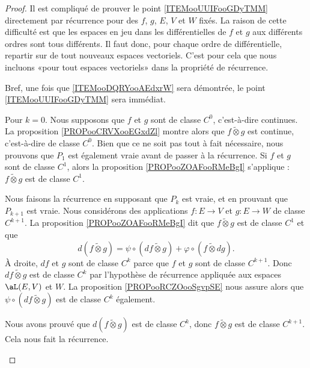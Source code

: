 \begin{proof}
	Il est compliqué de prouver le point \ref{ITEMooUUIFooGDyTMM} directement par récurrence pour des \( f\), \( g\), \( E\), \( V\) et \( W\) fixés. La raison de cette difficulté est que les espaces en jeu dans les différentielles de \( f\) et \( g\) aux différents ordres sont tous différents. Il faut donc, pour chaque ordre de différentielle, repartir sur de tout nouveaux espaces vectoriels. C'est pour cela que nous incluons «pour tout espaces vectoriels» dans la propriété de récurrence.

	Bref, une fois que \ref{ITEMooDQRYooAEdxrW} sera démontrée, le point \ref{ITEMooUUIFooGDyTMM} sera immédiat.

	\begin{subproof}
		\spitem[Pour \( k=0\)]
		Pour \( k=0\). Nous supposons que \( f\) et \( g\) sont de classe \( C^0\), c'est-à-dire continues. La proposition \ref{PROPooCRVXooEGxdZl} montre alors que \( f\tilde\otimes g\) est continue, c'est-à-dire de classe \( C^0\).
		\spitem[Pour \( k=1\)]
		Bien que ce ne soit pas tout à fait nécessaire, nous prouvons que \( P_1\) est également vraie avant de passer à la récurrence. Si \( f\) et \( g\) sont de classe \( C^1\), alors  la proposition \ref{PROPooZOAFooRMeBgI} s'applique : \( f\tilde\otimes g\) est de classe \( C^1\).

		\spitem[Pour \( k+1\)]
		Nous faisons la récurrence en supposant que \( P_k\) est vraie, et en prouvant que \( P_{k+1}\) est vraie. Nous considérons des applications  \( f\colon E\to V\) et \( g\colon E\to W\) de classe \( C^{k+1}\). La proposition \ref{PROPooZOAFooRMeBgI} dit que \( f\tilde\otimes g\) est de classe \( C^1\) et que
		\begin{equation}
			d(f\tilde\otimes g)=\psi\circ(df\tilde\otimes g)+\varphi\circ(f\tilde\otimes dg).
		\end{equation}
		À droite, \( df\) et \( g\) sont de classe \( C^k\) parce que \( f\) et \( g\) sont de classe \( C^{k+1}\). Donc \( df\tilde\otimes g\) est de classe \( C^k\) par l'hypothèse de récurrence appliquée aux espaces \( \aL(E,V)\) et \( W\). La proposition \ref{PROPooRCZOooSgvpSE} nous assure alors que \( \psi\circ(df\tilde\otimes g)\) est de classe \( C^k\) également.

		Nous avons prouvé que \( d(f\tilde\otimes g)\) est de classe \( C^k\), donc \( f\tilde\otimes g\) est de classe \( C^{k+1}\). Cela nous fait la récurrence.
	\end{subproof}
\end{proof}


